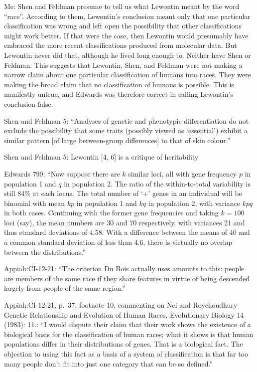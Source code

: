 \documentclass[11pt]{article}
\begin{document}
Me: Shen and Feldman presume to tell us what Lewontin meant by the
word ``race''. According to them, Lewontin's conclusion meant only that
one particular classification was wrong and left open the possibility
that other classifications might work better. If that were the case,
then Lewontin would presumably have embraced the more recent
classifications produced from molecular data. But Lewontin never did
that, although he lived long enough to. Neither have Shen or
Feldman. This suggests that Lewontin, Shen, and Feldman were not
making a narrow claim about one particular classification of humans
into races. They were making the broad claim that no classification of
humans is possible. This is manifestly untrue, and Edwards was
therefore correct in calling Lewontin's conclusion false.

Shen and Feldman 5: ``Analyses of genetic and phenotypic
differentiation do not exclude the possibility that some traits
(possibly viewed as ‘essential’) exhibit a similar pattern [of large
between-group differences] to that of skin colour.''

Shen and Feldman 5: Lewontin [4, 6] is a critique of heritability

Edwards 799: ``Now suppose there are $k$ similar loci, all with gene
frequency $p$ in population 1 and $q$ in population 2. The ratio of
the within-to-total variability is still 84\% at each locus. The total
number of ‘+’ genes in an individual will be binomial with mean $kp$
in population 1 and $kq$ in population 2, with variance $kpq$ in both
cases. Continuing with the former gene frequencies and taking $k =
100$ loci (say), the mean numbers are 30 and 70 respectively, with
variances 21 and thus standard deviations of 4.58. With a difference
between the means of 40 and a common standard deviation of less than
4.6, there is virtually no overlap between the distributions.''

Appiah:CI-12-21: ``The criterion Du Bois actually uses amounts to
this: people are members of the same race if they share features in
virtue of being descended largely from people of the same region.''

Appiah:CI-12-21, p.~37, footnote 10, commenting on Nei and
Roychoudhury Genetic Relationship and Evolution of Human Races,
Evolutionary Biology 14 (1983): 11.: ``I would dispute their claim
that their work shows the existence of a biological basis for the
classification of human races; what it shows is that human populations
differ in their distributions of genes. That is a biological fact. The
objection to using this fact as a basis of a system of classification
is that far too many people don't fit into just one category that can
be so defined.''
\end{document}
